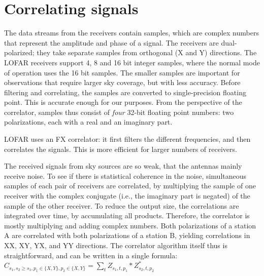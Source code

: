\documentclass{article}
\newcommand{\longversion}[1]{}
\begin{document}
\section{Correlating signals}
\label{sec:correlating}






The data streams from the receivers contain samples, which are complex
numbers that represent the amplitude and phase of a signal.  
The receivers are dual-polarized; they take separate
samples from orthogonal (X and Y) directions.  The LOFAR receivers
support 4, 8 and 16 bit integer samples, where the normal mode of
operation uses the 16 bit samples. The smaller samples are important
for observations that require larger sky coverage, but with less accuracy.
Before filtering and correlating, the
samples are converted to single-precision floating point.  This is
accurate enough for our purposes. From the perspective of the
correlator, samples thus consist of \emph{four} 32-bit floating point
numbers: two polarizations, each with a real and an imaginary part.

LOFAR uses an FX correlator: it first filters the different frequencies, and
then correlates the signals. This is more efficient for larger numbers of receivers.
\longversion{
Prior to correlation, the data that comes from
the receivers must be reordered:
each input carries the signals of many frequency bands from a single
receiver, but the correlator needs data from a single frequency of all inputs.
Depending on the data rate, switching the data can be a real challenge.
The data reordering phase is outside the scope of this paper, but a correlator
implementation cannot ignore this issue.
The LOFAR Blue Gene/P correlator uses the fast 3D~torus for this purpose;
other multi-core architectures need external switches.
}
The received signals from sky sources are so weak, that the antennas 
mainly receive noise. To see if there is statistical coherence
in the noise, simultaneous samples of each pair of receivers are correlated, 
by multiplying the sample of one receiver with the complex
conjugate (i.e., the imaginary part is negated) of the sample of the other receiver.
To reduce the output size, the correlations are integrated over time, by accumulating all products. 
Therefore, the correlator is mostly multiplying and adding complex numbers.
Both polarizations of a station A are correlated with both polarizations 
of a station B, yielding correlations in XX, XY, YX, and YY
directions.
The correlator algorithm itself thus is straightforward, and can be
written in a single formula: \\
$C_{s_1,s_2\geq s_1,p_1\in\{X,Y\},p_2\in\{X,Y\}} = \displaystyle\sum_{t} Z_{s_1,t,p_1} * Z_{s_2,t,p_2}^\ast$ 
\end{document}
